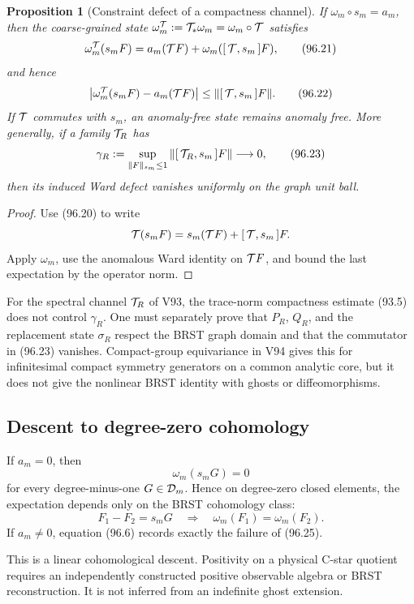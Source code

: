 \documentclass[11pt]{article}
\newtheorem{proposition}[theorem]{Proposition}
\theoremstyle{remark}
\begin{document}
\begin{proposition}[Constraint defect of a compactness channel]
\label{prop:v12v96-channel}
If \(\omega_m\circ s_m=a_m\), then the coarse-grained state
\(\omega_m^{\cal T}:={\cal T}_*\omega_m=\omega_m\circ{\cal T}\)
satisfies
\[
 \omega_m^{\cal T}(s_mF)
 =a_m({\cal T}F)+
   \omega_m([\,{\cal T},s_m\,]F),                                \tag{96.21}
\]
and hence
\[
 \left|
 \omega_m^{\cal T}(s_mF)-a_m({\cal T}F)
 \right|
 \leq\|[\,{\cal T},s_m\,]F\|.                                   \tag{96.22}
\]
If \({\cal T}\) commutes with \(s_m\), an anomaly-free state remains
anomaly free.  More generally, if a family \({\cal T}_R\) has
\[
 \gamma_R:=
 \sup_{\|F\|_{s_m}\leq1}
 \|[\,{\cal T}_R,s_m\,]F\|\longrightarrow0,                      \tag{96.23}
\]
then its induced Ward defect vanishes uniformly on the graph unit
ball.
\end{proposition}

\begin{proof}
Use (96.20) to write
\[
 {\cal T}(s_mF)=s_m({\cal T}F)+[\,{\cal T},s_m\,]F.
\]
Apply \(\omega_m\), use the anomalous Ward identity on
\({\cal T}F\), and bound the last expectation by the operator norm.
\end{proof}

For the spectral channel \({\cal T}_R\) of V93, the trace-norm
compactness estimate (93.5) does not control \(\gamma_R\).  One must
separately prove that \(P_R\), \(Q_R\), and the replacement state
\(\sigma_R\) respect the BRST graph domain and that the commutator
in (96.23) vanishes.  Compact-group equivariance in V94 gives this
for infinitesimal compact symmetry generators on a common analytic
core, but it does not give the nonlinear BRST identity with ghosts
or diffeomorphisms.

\subsection{Descent to degree-zero cohomology}

If \(a_m=0\), then
\[
 \omega_m(s_mG)=0                                               \tag{96.24}
\]
for every degree-minus-one \(G\in{\cal D}_m\).  Hence on
degree-zero closed elements, the expectation depends only on the
BRST cohomology class:
\[
 F_1-F_2=s_mG
 \quad\Longrightarrow\quad
 \omega_m(F_1)=\omega_m(F_2).                                   \tag{96.25}
\]
If \(a_m\neq0\), equation (96.6) records exactly the failure of
(96.25).

This is a linear cohomological descent.  Positivity on a physical
C-star quotient requires an independently constructed positive
observable algebra or BRST reconstruction.  It is not inferred from
an indefinite ghost extension.
\end{document}
